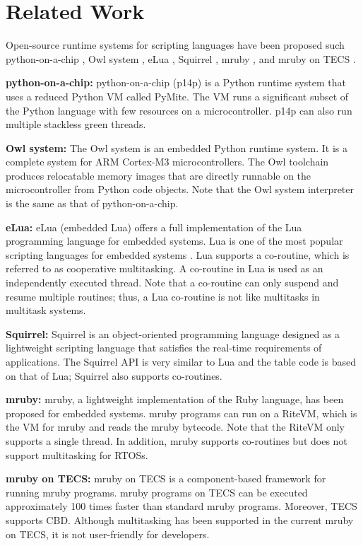 \documentclass[conference]{IEEEtran/IEEEtran/IEEEtran}
\begin{document}
\section{Related Work}
\label{sec:Related work}
Open-source runtime systems for scripting languages have been proposed such python-on-a-chip \cite{url:python-on-a-chip}, Owl system \cite{par:owl}, eLua \cite{url:eLua}, Squirrel \cite{url:Squirrel}, mruby \cite{par:mruby}, and mruby on TECS \cite{par:mrubyonTECS}.

{\bf python-on-a-chip:} python-on-a-chip (p14p) is a Python runtime system that uses a reduced Python VM called PyMite.
The VM runs a significant subset of the Python language with few resources on a microcontroller.
p14p can also run multiple stackless green threads.

{\bf Owl system:} The Owl system is an embedded Python runtime system.
It is a complete system for ARM Cortex-M3 microcontrollers.
The Owl toolchain produces relocatable memory images that are directly runnable on the microcontroller from Python code objects.
Note that the Owl system interpreter is the same as that of python-on-a-chip.

{\bf eLua:} eLua (embedded Lua) offers a full implementation of the Lua programming language for embedded systems.
Lua is one of the most popular scripting languages for embedded systems \cite{par:Lua}.
Lua supports a co-routine, which is referred to as cooperative multitasking.
A co-routine in Lua is used as an independently executed thread.
Note that a co-routine can only suspend and resume multiple routines; thus, a Lua co-routine is not like multitasks in multitask systems.

{\bf Squirrel:} Squirrel is an object-oriented programming language designed as a lightweight scripting language that satisfies the real-time requirements of applications.
The Squirrel API is very similar to Lua and the table code is based on that of Lua; Squirrel also supports co-routines.

{\bf mruby:} mruby, a lightweight implementation of the Ruby language, has been proposed for embedded systems.
mruby programs can run on a RiteVM, which is the VM for mruby and reads the mruby bytecode.
Note that the RiteVM only supports a single thread.
In addition, mruby supports co-routines but does not support multitasking for RTOSs.

{\bf mruby on TECS:} mruby on TECS is a component-based framework for running mruby programs.
mruby programs on TECS can be executed approximately 100 times faster than standard mruby programs.
Moreover, TECS supports CBD.
Although multitasking has been supported in the current mruby on TECS, it is not user-friendly for developers.
\end{document}
